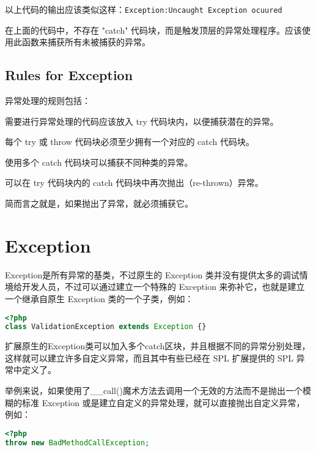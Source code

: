 以上代码的输出应该类似这样：\verb|Exception:Uncaught Exception ocuured|

在上面的代码中，不存在 "catch" 代码块，而是触发顶层的异常处理程序。应该使用此函数来捕获所有未被捕获的异常。





\section{Rules for Exception}

异常处理的规则包括：

\begin{compactitem}
\item 需要进行异常处理的代码应该放入 try 代码块内，以便捕获潜在的异常。
\item 每个 try 或 throw 代码块必须至少拥有一个对应的 catch 代码块。
\item 使用多个 catch 代码块可以捕获不同种类的异常。
\item 可以在 try 代码块内的 catch 代码块中再次抛出（re-thrown）异常。
\end{compactitem}

简而言之就是，如果抛出了异常，就必须捕获它。


\chapter{Exception}

Exception是所有异常的基类，不过原生的 Exception 类并没有提供太多的调试情境给开发人员，不过可以通过建立一个特殊的 Exception 来弥补它，也就是建立一个继承自原生 Exception 类的一个子类，例如：

\begin{lstlisting}[language=PHP]
<?php
class ValidationException extends Exception {}
\end{lstlisting}

扩展原生的Exception类可以加入多个catch区块，并且根据不同的异常分别处理，这样就可以建立许多自定义异常，而且其中有些已经在 SPL 扩展提供的 SPL 异常中定义了。

举例来说，如果使用了\_\_call()魔术方法去调用一个无效的方法而不是抛出一个模糊的标准 Exception 或是建立自定义的异常处理，就可以直接抛出自定义异常，例如：


\begin{lstlisting}[language=PHP]
<?php
throw new BadMethodCallException;
\end{lstlisting}



